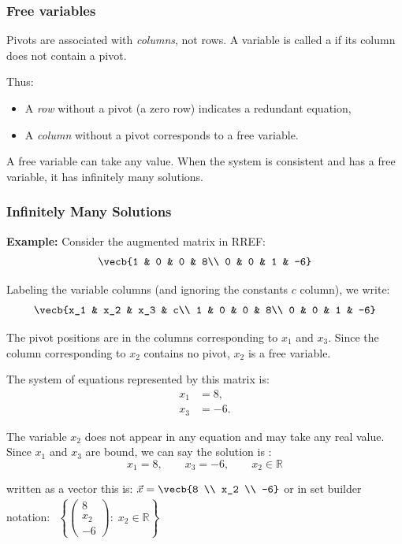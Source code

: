 \subsubsection{Free variables}
Pivots are associated with \emph{columns}, not rows.  
A variable is called a  if its column does not contain a pivot.

Thus:
\begin{itemize}
    \item A \emph{row} without a pivot (a zero row) indicates a redundant equation,
    \item A \emph{column} without a pivot corresponds to a free variable.
\end{itemize}

A free variable can take any value. When the system is consistent and has a free variable, it has infinitely many solutions.
\subsubsection{Infinitely Many Solutions}
\textbf{Example:}
Consider the augmented matrix in RREF:
\[
\vecb{1 & 0 & 0 & 8\\
      0 & 0 & 1 & -6}
\]

Labeling the variable columns (and ignoring the constants $c$ column), we write:
\[
\vecb{x_1 & x_2 & x_3 & c\\
      1   & 0   & 0   & 8\\
      0   & 0   & 1   & -6}
\]

The pivot positions are in the columns corresponding to \(x_1\) and \(x_3\).  
Since the column corresponding to \(x_2\) contains no pivot, \(x_2\) is a free variable.

The system of equations represented by this matrix is:
\[
\begin{aligned}
x_1 &= 8,\\
x_3 &= -6.
\end{aligned}
\]

The variable \(x_2\) does not appear in any equation and may take any real value.  
Since $x_1$ and $x_3$ are bound, we can say the solution is :
$$x_1 = 8,\qquad x_3 = -6,\qquad x_2 \in \mathbb{R}$$

written as a vector this is: $\vec{x} = \vecb{8 \\ x_2 \\ -6}$
or in set builder notation:
$\begin{array}{c} \left\{
\begin{pmatrix}
8\\
x_2\\
-6
\end{pmatrix}
:\; x_2 \in \mathbb{R}
\right\} \end{array}$

